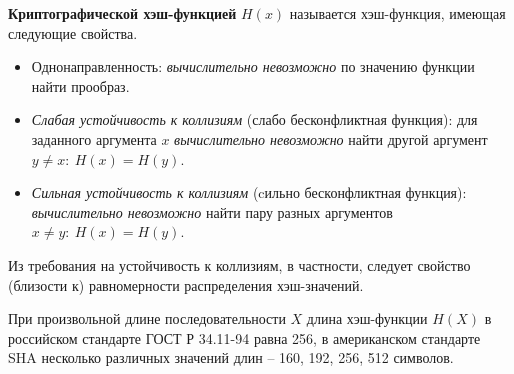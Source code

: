 \textbf{Криптографической хэш-функцией} $H(x)$ называется хэш-функция, имеющая следующие свойства.
\begin{itemize}
    \item Однонаправленность: \emph{вычислительно невозможно} по значению функции найти прообраз.
    \item \emph{Слабая устойчивость к коллизиям} (слабо бесконфликтная функция): для заданного аргумента $x$ \emph{вычислительно невозможно} найти другой аргумент $y \neq x: ~ H(x) = H(y)$.
    \item \emph{Сильная устойчивость к коллизиям} (cильно бесконфликтная функция): \emph{вычислительно невозможно} найти пару разных аргументов $x \neq y: ~ H(x) = H(y)$.
\end{itemize}

Из требования на устойчивость к коллизиям, в частности, следует свойство (близости к) равномерности распределения хэш-значений.

При произвольной длине последовательности $X$ длина хэш-функции $H(X)$  в российском стандарте ГОСТ Р 34.11-94 равна 256, в американском стандарте SHA несколько различных значений длин -- 160, 192, 256, 512 символов.
